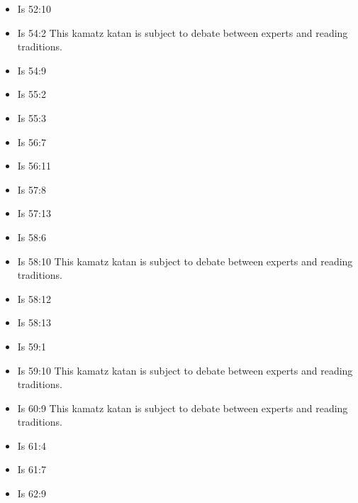 \documentclass[14pt]{article}
\begin{document}
\begin{multicols}{2}
\begin{itemize}
				\item Is 52:10
				
				\item Is 54:2 This kamatz katan is subject to debate between experts and reading traditions.
				
				\item Is 54:9
				
				\item Is 55:2
				
				\item Is 55:3
				
				\item Is 56:7
				
				\item Is 56:11
				
				\item Is 57:8
				
				\item Is 57:13
				
				\item Is 58:6
				
				\item Is 58:10 This kamatz katan is subject to debate between experts and reading traditions.
				
				\item Is 58:12
				
				\item Is 58:13
				
				\item Is 59:1
				
				\item Is 59:10 This kamatz katan is subject to debate between experts and reading traditions.
				
				\item Is 60:9 This kamatz katan is subject to debate between experts and reading traditions.
				
				\item Is 61:4
				
				\item Is 61:7
				
				\item Is 62:9
				

\end{itemize}
\end{multicols}
\end{document}
